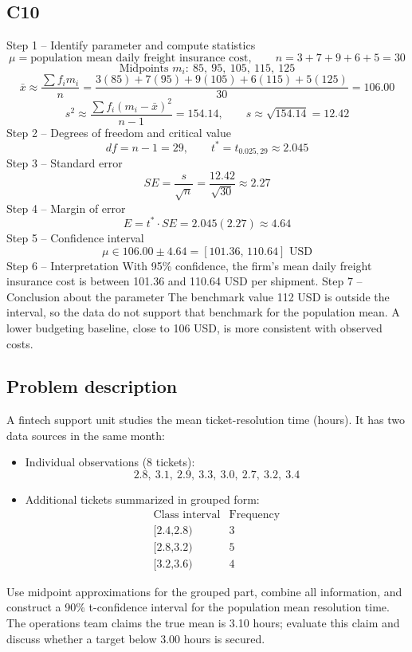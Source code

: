 \begin{ExamProblems}
		\subsection*{C10}
		Step 1 -- Identify parameter and compute statistics
		\[
		\mu=\text{population mean daily freight insurance cost},\qquad n=3+7+9+6+5=30
		\]
		\[
		\text{Midpoints }m_i:\ 85,\ 95,\ 105,\ 115,\ 125
		\]
		\[
		\bar{x}\approx\frac{\sum f_im_i}{n}=\frac{3(85)+7(95)+9(105)+6(115)+5(125)}{30}=106.00
		\]
		\[
		s^2\approx\frac{\sum f_i(m_i-\bar{x})^2}{n-1}=154.14,\qquad s\approx\sqrt{154.14}=12.42
		\]
		Step 2 -- Degrees of freedom and critical value
		\[
		df=n-1=29,\qquad t^*=t_{0.025,29}\approx 2.045
		\]
		Step 3 -- Standard error
		\[
		SE=\frac{s}{\sqrt{n}}=\frac{12.42}{\sqrt{30}}\approx 2.27
		\]
		Step 4 -- Margin of error
		\[
		E=t^*\cdot SE=2.045(2.27)\approx 4.64
		\]
		Step 5 -- Confidence interval
		\[
		\mu\in 106.00\pm 4.64=[101.36,\,110.64]\text{ USD}
		\]
		Step 6 -- Interpretation
		With 95\% confidence, the firm's mean daily freight insurance cost is between 101.36 and 110.64 USD per shipment.
		Step 7 -- Conclusion about the parameter
		The benchmark value 112 USD is outside the interval, so the data do not support that benchmark for the population mean.
		A lower budgeting baseline, close to 106 USD, is more consistent with observed costs.
		
		\newpage
		\item
		\subsection*{Problem description}
		A fintech support unit studies the mean ticket-resolution time (hours).
		It has two data sources in the same month:
		\begin{itemize}
			\item Individual observations (8 tickets):
			\[
			2.8,\ 3.1,\ 2.9,\ 3.3,\ 3.0,\ 2.7,\ 3.2,\ 3.4
			\]
			\item Additional tickets summarized in grouped form:
			\[
			\begin{array}{c|c}
			\text{Class interval} & \text{Frequency}\\ \hline
			\text{[2.4,2.8)} & 3\\
			\text{[2.8,3.2)} & 5\\
			\text{[3.2,3.6)} & 4
			\end{array}
			\]
		\end{itemize}
		Use midpoint approximations for the grouped part, combine all information, and construct a 90\% t-confidence interval for the population mean resolution time.
		The operations team claims the true mean is 3.10 hours; evaluate this claim and discuss whether a target below 3.00 hours is secured.
		

\end{ExamProblems}
